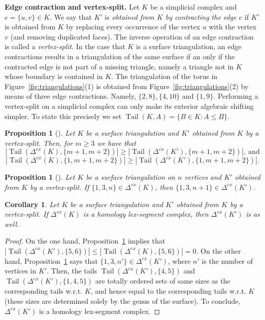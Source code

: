 \documentclass[11pt]{article}
\newtheorem{proposition}[theorem]{Proposition}
\newtheorem{corollary}[theorem]{Corollary}
\numberwithin{claimcounter}{theorem}
\theoremstyle{remark}
\theoremstyle{definition}
\numberwithin{theorem}{section}
\DeclareMathOperator{\tail}{Tail}
\newcommand{\exshift}[1]{\Delta^{ex}(#1)}
\begin{document}
%
\noindent
{\bf Edge contraction and vertex-split.}
Let $K$ be a simplicial complex and $e=\{u,v\}\in K$. We say that $K'$ is \emph{obtained from $K$ by contracting the edge $e$} if $K'$ is obtained from $K$ by replacing every occurrence of the vertex $u$ with the vertex $v$ (and removing duplicated faces).
The inverse operation of an edge contraction is called a \emph{vertex-split}.
In the case that $K$ is a surface triangulation, an edge contractions results in a triangulation of the same surface if an only if the contracted edge is not part of a missing triangle, namely a triangle not in $K$ whose boundary is contained in $K$. The triangulation of the torus in Figure~\ref{fig:triangulations}(1) is obtained from Figure~\ref{fig:triangulations}(2) by means of three edge contractions. Namely, $\{2,8\},\{4,10\}$ and $\{1,9\}$.
Performing a vertex-split on a simplicial complex can only make its exterior algebraic shifting simpler.
To state this precisely we set $\tail(K,A) = \{B \in K \colon A \leq B\}$.
%
\begin{proposition}[\cite{keehn24-exterior}]
  \label{p:splittail}
  Let $K$ be a surface triangulation and $K'$ obtained from $K$ by a vertex-split.
  Then, for $m\geq 3$ we have that
  $$|\tail(\exshift{K},\{m+1,m+2\})| \geq |\tail(\exshift{K'}, \{m+1,m+2\})|,~\text{and}$$
  $$|\tail(\exshift{K},\{1,m+1,m+2\})| \geq |\tail(\exshift{K'}, \{1,m+1,m+2\})|.$$
\end{proposition}
%
\begin{proposition}[\cite{bulavka23-rigidity}]
  \label{p:splitvolume}
  Let $K$ be a surface triangulation on $n$ vertices and $K'$ obtained from $K$ by a vertex-split.
  If $\{1,3,n\}\in \exshift K$, then $\{1,3,n+1\}\in \exshift{K'}$.
\end{proposition}
%
\begin{corollary}
\label{c:splithlex}
  Let $K$ be a surface triangulation and $K'$ obtained from $K$ by a vertex-split.
  If $\exshift K$ is a homology lex-segment complex, then $\exshift{K'}$ is as well.
\end{corollary}
\begin{proof}
  On the one hand, Proposition~\ref{p:splittail} implies that $|\tail(\exshift{K'},\{5,6\})|\leq |\tail(\exshift{K},\{5,6\})|=0.$
  On the other hand, Proposition~\ref{p:splitvolume} says that $\{1,3,n'\}\in \exshift{K'}$, where $n'$ is the number of vertices in $K'$.
  Then, the tails $\tail(\exshift{K'},\{4,5\})$ and $\tail(\exshift{K'},\{1,4,5\})$ are totally ordered sets 
  of same sizes as the corresponding tails w.r.t. $K$, and hence equal to the corresponding tails w.r.t. $K$
  (these sizes are determined solely by the genus of the surface). To conclude, $\exshift{K'}$ is a homology lex-segment complex.
\end{proof}
\end{document}
